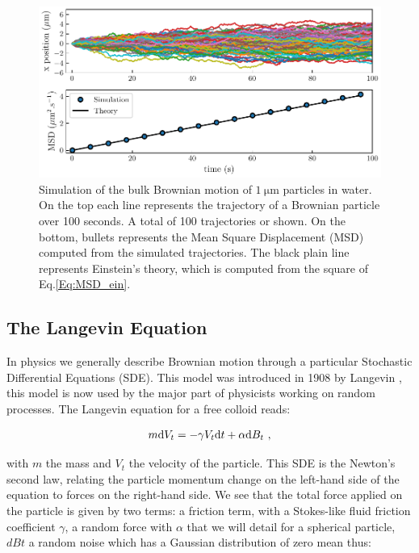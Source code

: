 \begin{figure}[!h]
	\centering
	\includegraphics{02_body/chapter1/image/brown_exemple.pdf}
	\caption{Simulation of the bulk Brownian motion of $1 ~ \mathrm{\mu m}$ particles in water. On the top each line represents the trajectory of a Brownian particle over 100 seconds. A total of 100 trajectories or shown. On the bottom, bullets represents the Mean Square Displacement (\gls{MSD}) computed from the simulated trajectories. The black plain line represents Einstein's theory, which is computed from the square of Eq.\ref{Eq:MSD_ein}.}
	\label{fig:bulkbrown}
\end{figure}

\subsection{The Langevin Equation}

In physics we generally describe Brownian motion through a particular Stochastic Differential Equations (\gls{SDE}). This model was introduced in 1908 by Langevin \cite{langevin_sur_1908}, this model is now used by the major part of physicists working on random processes. The Langevin equation for a free colloid reads:

\begin{equation}
	m \textnormal{d}V_t  = - \gamma V_t \textnormal{d}t + \alpha \textnormal{d}B_t ~,
	\label{Eq.langevinEquation}
\end{equation}


with $m$ the mass and $V_t$ the velocity of the particle. This \gls{SDE} is the Newton's second law, relating the particle momentum change on the left-hand side of the equation to forces on the right-hand side. We see that the total force applied on the particle is given by two terms: a friction term, with a Stokes-like fluid friction coefficient $\gamma$, a random force with $\alpha$ that we will detail for a spherical particle, $dBt$ a random noise which has a Gaussian distribution of zero mean thus:

